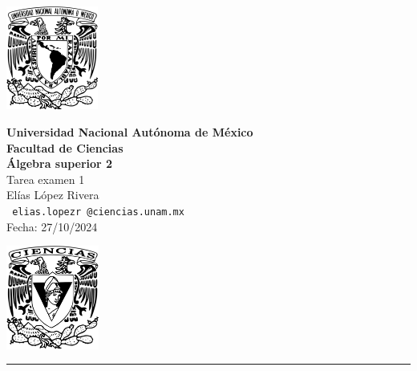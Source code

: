 \documentclass[11pt,letterpaper]{article}
\begin{document}

\begin{center}
    \begin{minipage}{3cm}
    	\begin{center}
    		\includegraphics[height=3.4cm]{logo_unam.png}
    	\end{center}
    \end{minipage}\hfill
    \begin{minipage}{10cm}
    	\begin{center}
    	\textbf{\large Universidad Nacional Autónoma de México}\\[0.1cm]
        \textbf{Facultad de Ciencias}\\[0.1cm]
        \textbf{\'Algebra superior 2}\\[0.1cm]
        Tarea examen 1 \\[0.1cm]
         El\'ias L\'opez Rivera\\[0.1cm]
        \texttt{ elias.lopezr\,@ciencias.unam.mx }\\[0.1cm]
        Fecha:\,\,27/10/2024
    	\end{center}
    \end{minipage}\hfill
    \begin{minipage}{3cm}
    	\begin{center}
    		\includegraphics[height=3.4cm]{Logo_FC.png}
    	\end{center}
    \end{minipage}
\end{center}

\rule{17cm}{0.1mm}
\end{document}
